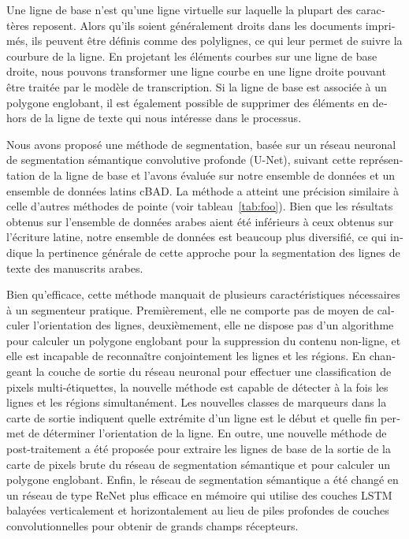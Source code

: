 \begin{french}
Une ligne de base n'est qu'une ligne virtuelle sur laquelle la plupart des
caractères reposent. Alors qu'ils soient généralement droits dans les documents
imprimés, ils peuvent être définis comme des polylignes, ce qui leur permet de
suivre la courbure de la ligne. En projetant les éléments courbes sur une ligne
de base droite, nous pouvons transformer une ligne courbe en une ligne droite
pouvant être traitée par le modèle de transcription. Si la ligne de base est
associée à un polygone englobant, il est également possible de supprimer des
éléments en dehors de la ligne de texte qui nous intéresse dans le processus.

Nous avons proposé une méthode de segmentation, basée sur un réseau neuronal de
segmentation sémantique convolutive profonde (U-Net), suivant cette
représentation de la ligne de base et l'avons évaluée sur notre ensemble de
données et un ensemble de données latins cBAD. La méthode a atteint une
précision similaire à celle d'autres méthodes de pointe (voir
tableau~\ref{tab:foo}).   Bien que les résultats obtenus sur l'ensemble de
données arabes aient été inférieurs à ceux obtenus sur l'écriture latine, notre
ensemble de données est beaucoup plus diversifié, ce qui indique la pertinence
générale de cette approche pour la segmentation des lignes de texte des
manuscrits arabes.

Bien qu'efficace, cette méthode manquait de plusieurs caractéristiques
nécessaires à un segmenteur pratique. Premièrement, elle ne comporte pas de
moyen de calculer l'orientation des lignes, deuxièmement, elle ne dispose pas
d'un algorithme pour calculer un polygone englobant pour la suppression du
contenu non-ligne, et elle est incapable de reconnaître conjointement les
lignes et les régions. En changeant la couche de sortie du réseau neuronal pour
effectuer une classification de pixels multi-étiquettes, la nouvelle méthode
est capable de détecter à la fois les lignes et les régions simultanément. Les
nouvelles classes de marqueurs dans la carte de sortie indiquent quelle
extrémite d'un ligne est le début et quelle fin permet de déterminer
l'orientation de la ligne. En outre, une nouvelle méthode de post-traitement a
été proposée pour extraire les lignes de base de la sortie de la carte de
pixels brute du réseau de segmentation sémantique et pour calculer un polygone
englobant. Enfin, le réseau de segmentation sémantique a été changé en un
réseau de type ReNet plus efficace en mémoire qui utilise des couches LSTM
balayées verticalement et horizontalement au lieu de piles profondes de couches
convolutionnelles pour obtenir de grands champs récepteurs.


\end{french}
